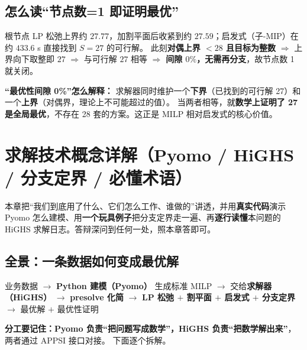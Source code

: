 \documentclass[11pt]{ctexart}
\begin{document}
\subsection{怎么读“节点数=1 即证明最优”}
根节点 LP 松弛上界约 $27.77$，加割平面后收紧到约 $27.59$；启发式（子-MIP）在约 $433.6$ s 直接找到 $S=27$ 的可行解。
此刻\textbf{对偶上界 $<28$ 且目标为整数} $\Rightarrow$ 上界向下取整即 $27$ $\Rightarrow$ 与可行解 $27$ 相等 $\Rightarrow$ \textbf{间隙 $0\%$，无需再分支}，故节点数 1 就关闭。
\begin{key}\textbf{“最优性间隙 0\%”怎么解释：}
求解器同时维护一个\textbf{下界}（已找到的可行解 27）和一个\textbf{上界}（对偶界，理论上不可能超过的值）。
当两者相等，就\textbf{数学上证明了 27 是全局最优}，不存在 28 套的方案。这正是 MILP 相对启发式的核心价值。
\end{key}

\section{求解技术概念详解（Pyomo / HiGHS / 分支定界 / 必懂术语）}
本章把“我们到底用了什么、它们怎么工作、谁做的”讲透，并用\textbf{真实代码}演示 Pyomo 怎么建模、用\textbf{一个玩具例子}把分支定界走一遍、再\textbf{逐行读懂}本问题的 HiGHS 求解日志。答辩深问到任何一处，照本章答即可。

\subsection{全景：一条数据如何变成最优解}
\begin{center}\small
业务数据 $\to$ \textbf{Python 建模（Pyomo）} 生成标准 MILP $\to$ 交给\textbf{求解器（HiGHS）} $\to$
\textbf{presolve 化简} $\to$ \textbf{LP 松弛 $+$ 割平面 $+$ 启发式 $+$ 分支定界} $\to$ 最优解 $+$ 最优性证明
\end{center}
\textbf{分工要记住：Pyomo 负责“把问题写成数学”，HiGHS 负责“把数学解出来”}，两者通过 APPSI 接口对接。
下面逐个拆解。
\end{document}
